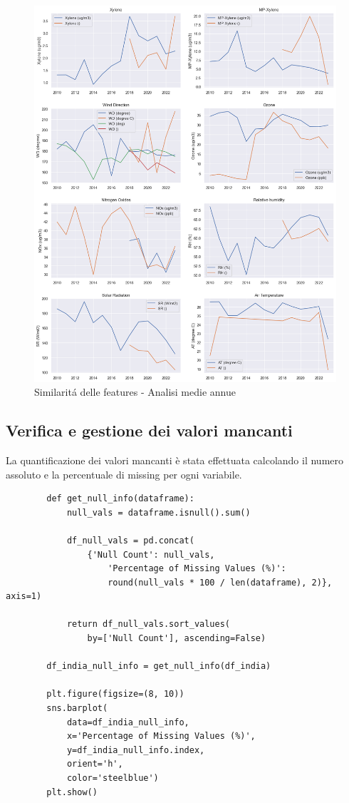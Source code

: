 \documentclass[a4paper,12pt]{report}
\begin{document}
	\begin{figure}[H]
		\centering
		\includegraphics[width=1.0\textwidth]{img/feat_red_pm.png}
		\caption{Similaritá delle features - Analisi medie annue}
	\end{figure}
	
	\subsection{Verifica e gestione dei valori mancanti}
	La quantificazione dei valori mancanti è stata effettuata calcolando il numero assoluto e la percentuale di missing per ogni variabile. \\
	\begin{verbatim}
		def get_null_info(dataframe):
			null_vals = dataframe.isnull().sum()
			
			df_null_vals = pd.concat(
				{'Null Count': null_vals,
					'Percentage of Missing Values (%)': 
					round(null_vals * 100 / len(dataframe), 2)}, axis=1)
			
			return df_null_vals.sort_values(
				by=['Null Count'], ascending=False)
		
		df_india_null_info = get_null_info(df_india)
		
		plt.figure(figsize=(8, 10))
		sns.barplot(
			data=df_india_null_info, 
			x='Percentage of Missing Values (%)', 
			y=df_india_null_info.index, 
			orient='h', 
			color='steelblue')
		plt.show()
	\end{verbatim}
	
\end{document}
